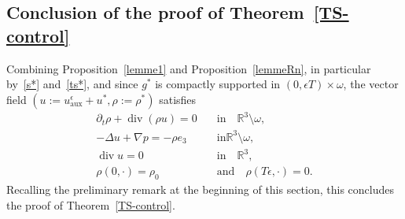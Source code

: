 \documentclass[AHL,Unicode,longabstracts,published]{cedram}
\newcommand{\aux}{\mathrm{aux}}
\newcommand{\R}{\mathbb{R}}
\renewcommand{\div}{\operatorname{div}}
\newcommand{\eps}{\epsilon}
\begin{document}
\subsection{Conclusion of the proof of Theorem~\ref{TS-control}}

Combining Proposition~\ref{lemme1} and Proposition~\ref{lemmeRn}, in particular by~\eqref{s*} and~\eqref{ts*}, and since $g^*$ is compactly supported in $(0,\eps T)\times \omega$, the vector field $(u:= u^\eps_\aux+u^*,\rho :=\rho^*)$ satisfies
\begin{align*}
\partial_t \rho+ \div (\rho u)= 0 \quad &\text{in} \quad \R^3 \setminus \omega,
\\ -\Delta u + \nabla p = - \rho e_3 \quad &\text{in} \R^3 \setminus \omega,\\
\div u = 0
\quad &\text{in} \quad \R^3,\\
\rho(0,\cdot)=\rho_0 \quad &\text{and} \quad
\rho(T\eps,\cdot)=0.
\end{align*}
Recalling the preliminary remark at the beginning of this section, this concludes the proof of Theorem~\ref{TS-control}.





\end{document}
